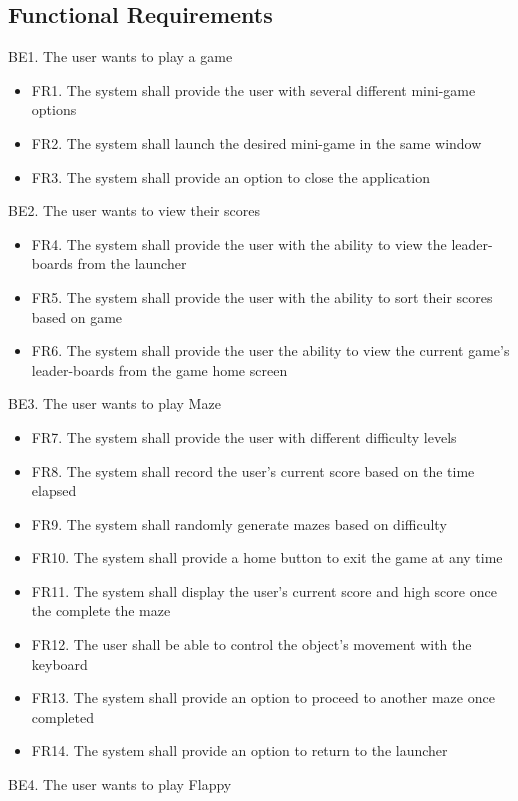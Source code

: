 \documentclass[12pt, titlepage]{article}
\begin{document}
\subsection{Functional Requirements}
    BE1. The user wants to play a game
    \begin{itemize}
    \item FR1. The system shall provide the user with several different mini-game options
    \item FR2. The system shall launch the desired mini-game in the same window
    \item FR3. The system shall provide an option to close the application
    \end{itemize}
    BE2. The user wants to view their scores
    \begin{itemize}
        \item FR4. The system shall provide the user with the ability to view the leader-boards from the launcher
        \item FR5. The system shall provide the user with the ability to sort their scores based on game
        \item FR6. The system shall provide the user the ability to view the current game’s leader-boards from the game home screen
    \end{itemize}
    BE3. The user wants to play Maze
    \begin{itemize}
        \item FR7. The system shall provide the user with different          difficulty levels
        \item FR8. The system shall record the user’s current score based on the time elapsed
        \item FR9. The system shall randomly generate mazes based on difficulty
        \item FR10. The system shall provide a home button to exit the game at any time
        \item FR11. The system shall display the user’s current score and high score once the complete the maze
        \item FR12. The user shall be able to control the object’s movement with the keyboard
        \item FR13. The system shall provide an option to proceed to another maze once completed
        \item FR14. The system shall provide an option to return to the launcher
    \end{itemize}
    BE4. The user wants to play Flappy
\end{document}
